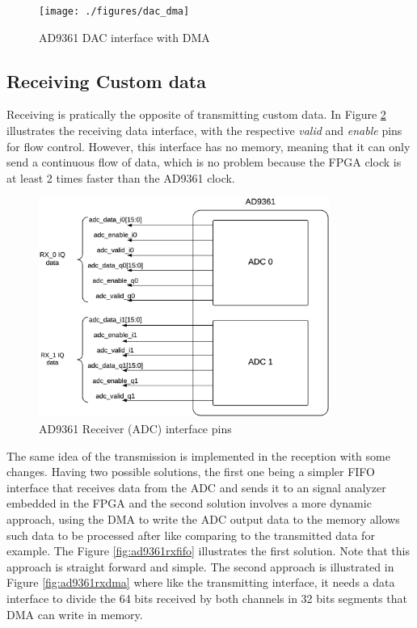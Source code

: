 
\begin{figure}[htbp]
    \centering
    \texttt{[image: ./figures/dac\_dma]}
    \caption{ AD9361 DAC interface with DMA
    \label{fig:ad9361txdma}}
\end{figure}

\subsection{Receiving Custom data}

Receiving is pratically the opposite of transmitting custom data. In Figure
\ref{fig:rxpins} illustrates the receiving data interface, with the respective
\emph{valid} and \emph{enable} pins for flow control. However, this interface
has no memory, meaning that it can only send a continuous flow of data, which is
no problem because the FPGA clock is at least 2 times faster than the AD9361
clock.

\begin{figure}[htbp]
    \centering
    \includegraphics[width=0.85\textwidth]{./figures/ad9361rx_pins}
    \caption{ AD9361 Receiver (ADC) interface pins
    \label{fig:rxpins}}
\end{figure}

The same idea of the transmission is implemented in the reception with some
changes. Having two possible solutions, the first one being a simpler FIFO
interface that receives data from the ADC and sends it to an signal analyzer
embedded in the FPGA and the second solution involves a more dynamic approach,
using the DMA to write the ADC output data to the memory allows such data to be
processed after like comparing to the transmitted data for example. The Figure
\ref{fig:ad9361rxfifo} illustrates the first solution. Note that this approach
is straight forward and simple. The second approach is illustrated in Figure
\ref{fig:ad9361rxdma} where like the transmitting interface, it needs a data
interface to divide the 64 bits received by both channels in 32 bits segments
that DMA can write in memory.


